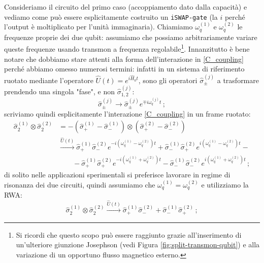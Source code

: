 \noindent Consideriamo il circuito del primo caso (accoppiamento dato dalla capacità) e vediamo come può essere esplicitamente costruito un \texttt{iSWAP-gate} (la $i$ perché l'output è moltiplicato per l'unità immaginaria). Chiamiamo $\omega_q^{(1)}$ e $\omega_q^{(2)}$ le frequenze proprie dei due qubit: assumiamo che possiamo arbitrariamente variare queste frequenze usando transmon a frequenza regolabile\footnote{Si ricordi che questo scopo può essere raggiunto grazie all'inserimento di un'ulteriore giunzione Josephson (vedi Figura \ref{fig:split-transmon-qubit}) e alla variazione di un opportuno flusso magnetico esterno.}. Innanzitutto è bene notare che dobbiamo stare attenti alla forma dell'interazione in \eqref{C_coupling} perché abbiamo omesso numerosi termini: infatti in un sistema di riferimento ruotato mediante l'operatore $\hat{U}(t) = e^{i \hat{H}_0 t}$, sono gli operatori $\hat{\sigma}_{\pm}^{(j)}$ a trasformare prendendo una singola "fase", e non $\hat{\sigma}_{1,2}^{(j)}$:
\begin{equation*}
    \hat{\sigma}_{\pm}^{(j)} \longrightarrow \hat{\sigma}_{\pm}^{(j)} e^{\mp i \omega_q^{(j)} t} \, ;
\end{equation*}
scriviamo quindi esplicitamente l'interazione \eqref{C_coupling} in un frame ruotato:
\begin{align*}
    \hat{\sigma}_2^{(1)} \otimes \hat{\sigma}_2^{(2)} &= - \left( \hat{\sigma}_+^{(1)} - \hat{\sigma}_-^{(1)} \right) \otimes \left( \hat{\sigma}_+^{(2)} - \hat{\sigma}_-^{(2)} \right) \\
    &\overset{\hat{U}(t)}{\longrightarrow} \hat{\sigma}_+^{(1)} \hat{\sigma}_-^{(2)} e^{-i \left( \omega_q^{(1)} - \omega_q^{(2)} \right) t} + \hat{\sigma}_-^{(1)} \hat{\sigma}_+^{(2)} e^{i \left( \omega_q^{(1)} - \omega_q^{(2)} \right) t} - \\
    &\qquad - \hat{\sigma}_+^{(1)} \hat{\sigma}_+^{(2)} e^{-i \left( \omega_q^{(1)} + \omega_q^{(2)} \right) t} - \hat{\sigma}_-^{(1)} \hat{\sigma}_-^{(2)} e^{i \left( \omega_q^{(1)} + \omega_q^{(2)} \right) t} \, ;
\end{align*}
di solito nelle applicazioni sperimentali si preferisce lavorare in regime di risonanza dei due circuiti, quindi assumiamo che $\omega_q^{(1)} = \omega_q^{(2)}$ e utilizziamo la RWA:
\begin{equation*}
    \hat{\sigma}_2^{(1)} \otimes \hat{\sigma}_2^{(2)} \overset{\hat{U}(t)}{\longrightarrow} \hat{\sigma}_+^{(1)} \hat{\sigma}_-^{(2)} + \hat{\sigma}_-^{(1)} \hat{\sigma}_+^{(2)} \, ;
\end{equation*}
